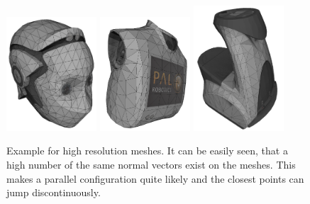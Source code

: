 \begin{figure}[h!]
  \centering
    \includegraphics[width=0.3\textwidth]{../figures/mesh_head.png}
    \includegraphics[width=0.3\textwidth]{../figures/mesh_torso.png}
    \includegraphics[width=0.3\textwidth]{../figures/mesh_base.png}
    \caption{Example for high resolution meshes. It can be easily seen, that a high number of the same normal vectors exist on the meshes. This makes a parallel configuration quite likely and the closest points can jump discontinuously.}
    \label{figmeshambiguity}
\end{figure}

